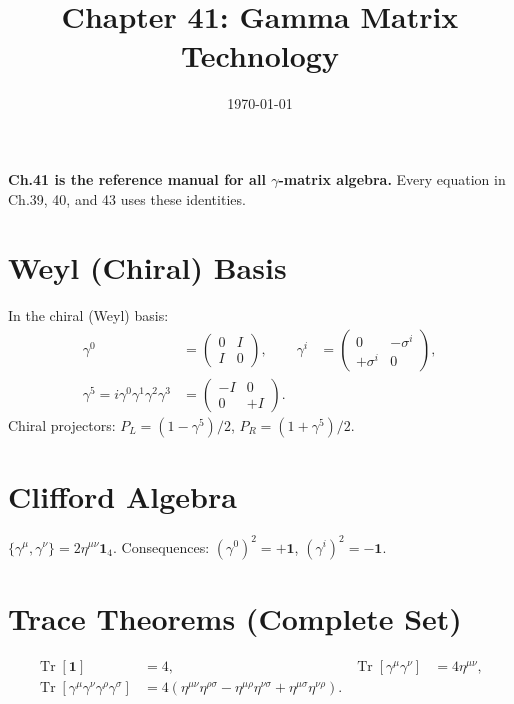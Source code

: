 \documentclass[12pt]{article}
\DeclareMathOperator\Tr{Tr}
\begin{document}
\title{Chapter 41: Gamma Matrix Technology}
\date{\today}
\maketitle

\begin{mdframed}[backgroundcolor=blue!5]
\textbf{Ch.41 is the reference manual for all $\gamma$-matrix algebra.}
Every equation in Ch.39, 40, and 43 uses these identities.
\end{mdframed}

\section{Weyl (Chiral) Basis}\label{sec:chiral}
In the chiral (Weyl) basis:
\begin{align}
\gamma^0 &= \begin{pmatrix}0&I\\I&0\end{pmatrix}, &
\gamma^i &= \begin{pmatrix}0&-\sigma^i\\+\sigma^i&0\end{pmatrix}, \\
\gamma^5 = i\gamma^0\gamma^1\gamma^2\gamma^3
         &= \begin{pmatrix}-I&0\\0&+I\end{pmatrix} .
\end{align}
Chiral projectors: $P_L=(1-\gamma^5)/2$, $P_R=(1+\gamma^5)/2$.

\section{Clifford Algebra}
$\{\gamma^\mu,\gamma^\nu\}=2\eta^{\mu\nu}\mathbf{1}_4$.
Consequences: $(\gamma^0)^2=+\mathbf{1}$, $(\gamma^i)^2=-\mathbf{1}$.

\section{Trace Theorems (Complete Set)}
\begin{align}
\Tr[\mathbf{1}] &= 4, &
\Tr[\gamma^\mu\gamma^\nu] &= 4\eta^{\mu\nu}, \\
\Tr[\gamma^\mu\gamma^\nu\gamma^\rho\gamma^\sigma]
&= 4(\eta^{\mu\nu}\eta^{\rho\sigma}
   -\eta^{\mu\rho}\eta^{\nu\sigma}
   +\eta^{\mu\sigma}\eta^{\nu\rho}) .
\end{align}
\end{document}
